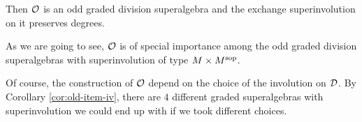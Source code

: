 \begin{ex}
	Then $\mathcal O$ is an odd graded division superalgebra and the exchange superinvolution on it preserves degrees.
\end{ex}

As we are going to see, $\mathcal O$ is of special importance among the odd graded division superalgebras with superinvolution of type $M\times M^{\mathrm{sop}}$.

Of course, the construction of $\mathcal O$ depend on the choice of the involution on $\mathcal{D}$.
By Corollary \ref{cor:old-item-iv}, there are $4$ different graded superalgebras with superinvolution we could end up with if we took different choices.

